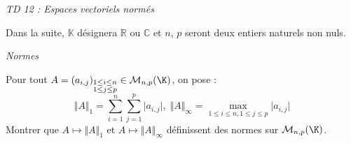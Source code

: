 \documentclass[a4paper,10pt]{report}
\begin{document}
\everymath{\displaystyle}

\begin{center}
\textit{{ {\huge TD 12 : Espaces vectoriels normés}}}
\end{center}


\bigskip

\noindent Dans la suite, $\mathbb{K}$ désignera $\mathbb{R}$ ou $\mathbb{C}$ et $n$, $p$ seront deux entiers naturels non nuls.

\medskip

\begin{center}
\textit{{ {\large Normes}}}
\end{center}

\medskip



\begin{Exa} Pour tout $A = (a_{i,j})_{\substack{1 \leq i \leq n \\ 1 \leq j \leq p}} \in \mathcal{M}_{n,p}(\K)$, on pose :
$$\Vert A \Vert_{1}  = \sum_{i = 1}^{n} \sum_{j = 1}^{p} \vert a_{i,j} \vert, \; \Vert A \Vert_{\infty}  = \max_{1 \leq i \leq n,1 \leq j \leq p} \vert a_{i,j} \vert $$
Montrer que $A \mapsto \Vert A \Vert_{1}$ et $A \mapsto \Vert A \Vert_{\infty}$ définissent des normes sur $\mathcal{M}_{n,p}(\K)$.
\end{Exa}
\end{document}
